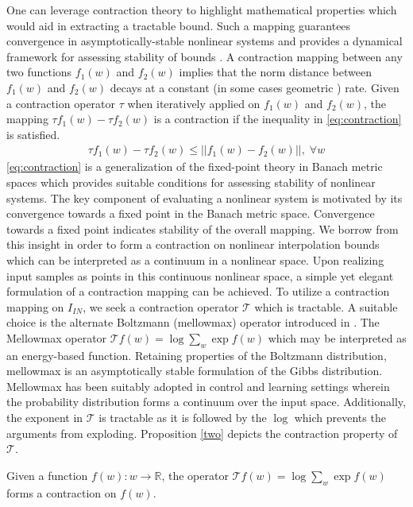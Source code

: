 \documentclass{article}
\begin{document}
One can leverage contraction theory \cite{banach, contraction} to highlight mathematical properties which would aid in extracting a tractable bound. Such a mapping guarantees convergence in asymptotically-stable nonlinear systems \cite{contraction} and provides a dynamical framework for assessing stability of bounds \cite{sql}. A contraction mapping between any two functions $f_{1}(w)$ and $f_{2}(w)$ implies that the norm distance between $f_{1}(w)$ and $f_{2}(w)$ decays at a constant (in some cases geometric \cite{banach}) rate. Given a contraction operator $\tau$ when iteratively applied on $f_{1}(w)$ and $f_{2}(w)$, the mapping $\tau f_{1}(w) - \tau f_{2}(w)$ is a contraction if the inequality in \autoref{eq:contraction} is satisfied.
\begin{gather}
  \tau f_{1}(w) - \tau f_{2}(w) \leq ||f_{1}(w) - f_{2}(w)||,\; \forall w \label{eq:contraction}
\end{gather} 
\autoref{eq:contraction} is a generalization of the fixed-point theory in Banach metric spaces \cite{contraction} which provides suitable conditions for assessing stability of nonlinear systems. The key component of evaluating a nonlinear system is motivated by its convergence towards a fixed point in the Banach metric space. Convergence towards a fixed point indicates stability of the overall mapping. We borrow from this insight in order to form a contraction on nonlinear interpolation bounds which can be interpreted as a continuum in a nonlinear space. Upon realizing input samples as points in this continuous nonlinear space, a simple yet elegant formulation of a contraction mapping can be achieved. To utilize a contraction mapping on $I_{IN}$, we seek a contraction operator $\mathcal{T}$ which is tractable. A suitable choice is the alternate Boltzmann (mellowmax) operator introduced in \cite{mellowmax}. The Mellowmax operator $\mathcal{T}f(w)=\log \sum_{w} \exp{f(w)}$ which may be interpreted as an energy-based function. Retaining properties of the Boltzmann distribution, mellowmax is an asymptotically stable formulation of the Gibbs distribution. Mellowmax has been suitably adopted in control and learning settings \cite{sql,emix} wherein the probability distribution forms a continuum over the input space. Additionally, the exponent in $\mathcal{T}$ is tractable as it is followed by the $\log$ which prevents the arguments from exploding. Proposition \autoref{two} depicts the contraction property of $\mathcal{T}$. 
\begin{customthm}{2}\label{two}
  Given a function $f(w):w\rightarrow \mathbb{R}$, the operator $\mathcal{T}f(w)=\log \sum_{w} \exp{f(w)}$ forms a contraction on $f(w)$. 
\end{customthm}
\end{document}
